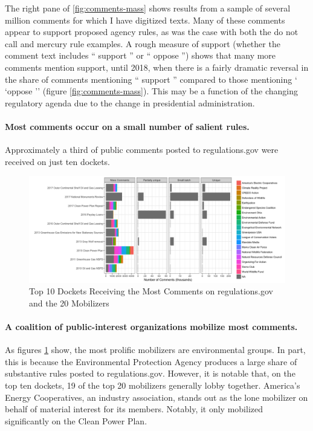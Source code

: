The right pane of \ref{fig:comments-mass} shows results from a sample of several million comments for which I have digitized texts. Many of these comments appear to support proposed agency rules, as was the case with both the do not call and mercury rule examples. A rough measure of support (whether the comment text includes `` support '' or `` oppose '') shows that many more comments mention support, until 2018, when there is a fairly dramatic reversal in the share of comments mentioning `` support '' compared to those mentioning ` `oppose '' (figure \ref{fig:comments-mass}). This may be a function of the changing regulatory agenda due to the change in presidential administration. 



\paragraph{Most comments occur on a small number of salient rules.} Approximately a third of public comments posted to regulations.gov were received on just ten dockets.


\begin{figure}
    \centering
    \includegraphics[width = 6in]{Figs/topdockets.png}
    \caption{Top 10 Dockets Receiving the Most Comments on regulations.gov and the 20 Mobilizers}
    \label{fig:topdockets}
\end{figure}


\paragraph{A coalition of public-interest organizations mobilize most comments.} As figures \ref{fig:topdockets}%
show, the most prolific mobilizers are environmental groups. In part, this is because the Environmental Protection Agency produces a large share of substantive rules posted to regulations.gov. However, it is notable that, on the top ten dockets, 19 of the top 20 mobilizers generally lobby together. America's Energy Cooperatives, an industry association, stands out as the lone mobilizer on behalf of material interest for its members. Notably, it only mobilized significantly on the Clean Power Plan. 